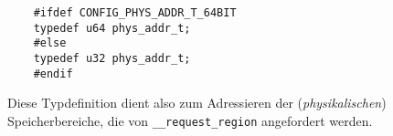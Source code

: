 \begin{verbatim}
    #ifdef CONFIG_PHYS_ADDR_T_64BIT
    typedef u64 phys_addr_t;
    #else
    typedef u32 phys_addr_t;
    #endif
\end{verbatim}

\noindent
Diese Typdefinition dient also zum Adressieren der (\textit{physikalischen}) Speicherbereiche, die von \texttt{\_\_request\_region} angefordert werden.